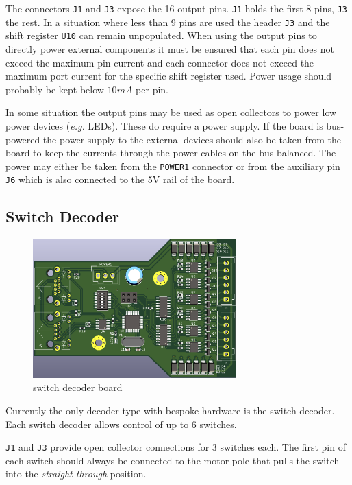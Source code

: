 \documentclass{scrreprt}
\newcommand\eg{\emph{e.g. }}
\begin{document}
The connectors \texttt{J1} and \texttt{J3} expose the 16 output pins.
\texttt{J1} holds the first 8 pins, \texttt{J3} the rest.
In a situation where less than 9 pins are used the header \texttt{J3} and 
the shift register \texttt{U10} can remain unpopulated.
When using the output pins to directly power external components it must be ensured that each pin does not exceed the maximum pin current and each connector does not exceed the maximum port current for the specific shift register used.
Power usage should probably be kept below $10mA$ per pin.

In some situation the output pins may be used as open collectors to power low power devices (\eg LEDs).
These do require a power supply.
If the board is bus-powered the power supply to the external devices should also be taken from the board to keep the currents through the power cables on the bus balanced.
The power may either be taken from the \texttt{POWER1} connector or from the auxiliary pin \texttt{J6} which is also connected to the 5V rail of the board.

\subsection{Switch Decoder}
\begin{figure}[h!]
    \centering
    \includegraphics[width=0.7\textwidth]{switch_decoder}
    \caption{switch decoder board}
\end{figure}

Currently the only decoder type with bespoke hardware is the switch decoder.
Each switch decoder allows control of up to 6 switches.

\texttt{J1} and \texttt{J3} provide open collector connections for 3 switches each.
The first pin of each switch should always be connected to the motor pole that pulls the switch into the \emph{straight-through} position.
\end{document}
